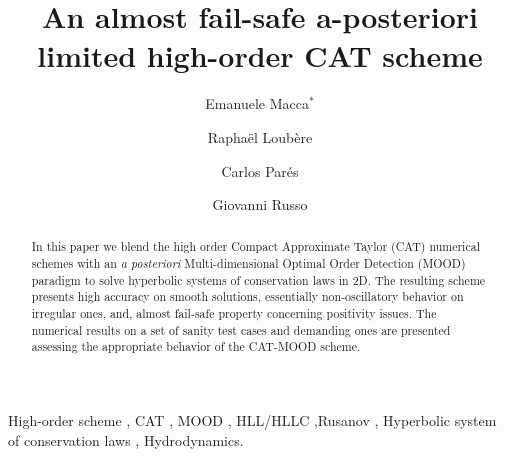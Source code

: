 \documentclass[3p,times]{elsarticle}
\begin{document}
 
\begin{frontmatter}
\title{An almost fail-safe a-posteriori limited high-order CAT scheme} 

\author[catania]{Emanuele Macca$^{*}$}

\author[bordeaux]{Rapha{\"e}l Loub{\`e}re}

\author[malaga]{Carlos Par{\'e}s}

\author[catania]{Giovanni Russo}


\address[bordeaux]{Universit{\'e} de Bordeaux, CNRS, Bordeaux INP, IMB, UMR 5251, F-33400 Talence, France}
\address[malaga]{Departamento de An{\'a}lisis Matem{\'a}tico, Estad{\'i}stica e Investigaci{\'o}n Operativa, y Matem{\'a}tica aplicada, Universidad de M{\'a}laga, Bulevar Louis Pasteur, 31, 29010, Málaga, Spain}
\address[catania]{Dipartimento di Matematica ed Informatica Universit{\'a} di Catania, Viale Andrea Doria 6, 95125, Catania, Italy}

\begin{abstract}
In this paper we blend the high order Compact Approximate Taylor (CAT) numerical schemes with an \textit{a posteriori} Multi-dimensional Optimal Order Detection (MOOD) paradigm to solve hyperbolic systems of conservation laws in 2D. The resulting scheme presents high accuracy on smooth solutions, essentially non-oscillatory behavior on irregular ones, and, almost fail-safe property concerning positivity issues. 
The numerical results on a set of sanity test cases and demanding ones are presented assessing the appropriate behavior of the CAT-MOOD scheme.
\end{abstract}

\begin{keyword}
 High-order scheme \sep
 CAT \sep
 MOOD \sep
 HLL/HLLC \sep Rusanov \sep
 Hyperbolic system of conservation laws \sep
 Hydrodynamics.
\end{keyword}
\end{frontmatter}
\end{document}

